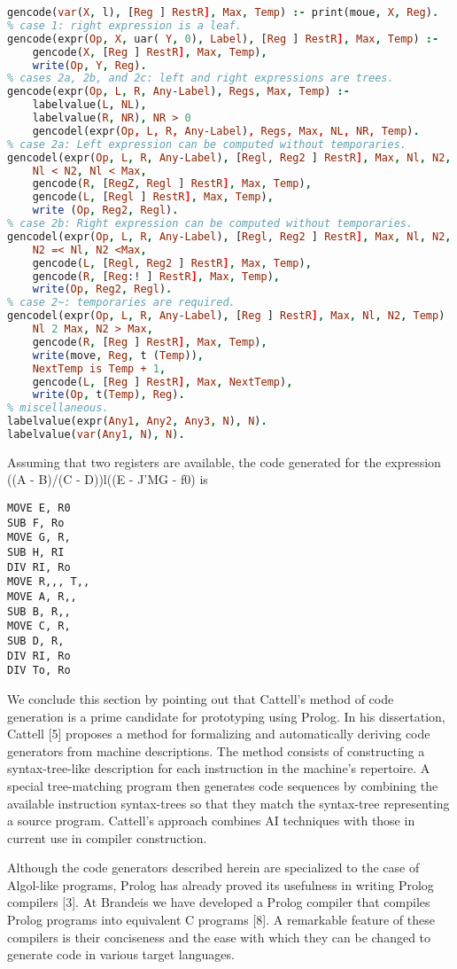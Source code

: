 \begin{lstlisting}[language=prolog]
% case 0: left expression is a leaf.
gencode(var(X, l), [Reg ] RestR], Max, Temp) :- print(moue, X, Reg).
% case 1: right expression is a leaf.
gencode(expr(Op, X, uar( Y, 0), Label), [Reg ] RestR], Max, Temp) :-
	gencode(X, [Reg ] RestR], Max, Temp),
	write(Op, Y, Reg).
% cases 2a, 2b, and 2c: left and right expressions are trees.
gencode(expr(Op, L, R, Any-Label), Regs, Max, Temp) :-
	labelvalue(L, NL),
	labelvalue(R, NR), NR > 0
	gencodel(expr(Op, L, R, Any-Label), Regs, Max, NL, NR, Temp).
% case 2a: Left expression can be computed without temporaries.
gencodel(expr(Op, L, R, Any-Label), [Regl, Reg2 ] RestR], Max, Nl, N2, Temp) :-
	Nl < N2, Nl < Max,
	gencode(R, [RegZ, Regl ] RestR], Max, Temp),
	gencode(L, [Regl ] RestR], Max, Temp),
	write (Op, Reg2, Regl).
% case 2b: Right expression can be computed without temporaries.
gencodel(expr(Op, L, R, Any-Label), [Regl, Reg2 ] RestR], Max, Nl, N2, Temp) :-
	N2 =< Nl, N2 <Max,
	gencode(L, [Regl, Reg2 ] RestR], Max, Temp),
	gencode(R, [Reg:! ] RestR], Max, Temp),
	write(Op, Reg2, Regl).
% case 2~: temporaries are required.
gencodel(expr(Op, L, R, Any-Label), [Reg ] RestR], Max, Nl, N2, Temp) :-
	Nl 2 Max, N2 > Max,
	gencode(R, [Reg ] RestR], Max, Temp),
	write(move, Reg, t (Temp)),
	NextTemp is Temp + 1,
	gencode(L, [Reg ] RestR], Max, NextTemp),
	write(Op, t(Temp), Reg).
% miscellaneous.
labelvalue(expr(Any1, Any2, Any3, N), N).
labelvalue(var(Any1, N), N). 
\end{lstlisting}

Assuming that two registers are available, the code generated for the expression
((A - B)/(C - D))l((E - J’MG - f0) is
\begin{verbatim}
MOVE E, R0
SUB F, Ro
MOVE G, R,
SUB H, RI
DIV RI, Ro
MOVE R,,, T,,
MOVE A, R,,
SUB B, R,,
MOVE C, R,
SUB D, R,
DIV RI, Ro
DIV To, Ro
\end{verbatim}

We conclude this section by pointing out that Cattell’s method of code generation
is a prime candidate for prototyping using Prolog. In his dissertation,
Cattell [5] proposes a method for formalizing and automatically deriving code
generators from machine descriptions. The method consists of constructing a
syntax-tree-like description for each instruction in the machine’s repertoire.
A special tree-matching program then generates code sequences by combining
the available instruction syntax-trees so that they match the syntax-tree representing
a source program. Cattell’s approach combines AI techniques with those
in current use in compiler construction. 

Although the code generators described herein are specialized to the case of
Algol-like programs, Prolog has already proved its usefulness in writing Prolog
compilers [3]. At Brandeis we have developed a Prolog compiler that compiles
Prolog programs into equivalent C programs [8]. A remarkable feature of these
compilers is their conciseness and the ease with which they can be changed to
generate code in various target languages. 
